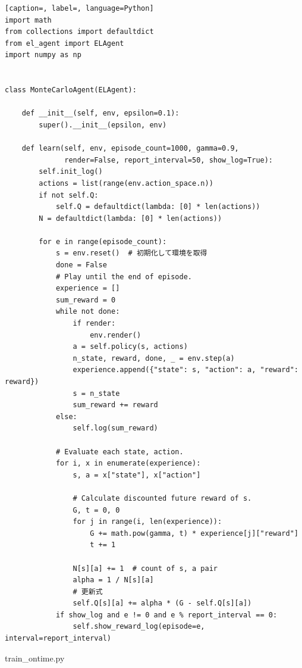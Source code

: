 \documentclass[a4paper,12pt]{jsreport}
\theoremstyle{definition}
\begin{document}
\begin{lstlisting}[caption=, label=, language=Python]
import math
from collections import defaultdict
from el_agent import ELAgent
import numpy as np


class MonteCarloAgent(ELAgent):

    def __init__(self, env, epsilon=0.1):
        super().__init__(epsilon, env)

    def learn(self, env, episode_count=1000, gamma=0.9,
              render=False, report_interval=50, show_log=True):
        self.init_log()
        actions = list(range(env.action_space.n))
        if not self.Q:
            self.Q = defaultdict(lambda: [0] * len(actions))
        N = defaultdict(lambda: [0] * len(actions))

        for e in range(episode_count):
            s = env.reset()  # 初期化して環境を取得
            done = False
            # Play until the end of episode.
            experience = []
            sum_reward = 0
            while not done:
                if render:
                    env.render()
                a = self.policy(s, actions)
                n_state, reward, done, _ = env.step(a)
                experience.append({"state": s, "action": a, "reward": reward})
                s = n_state
                sum_reward += reward
            else:
                self.log(sum_reward)

            # Evaluate each state, action.
            for i, x in enumerate(experience):
                s, a = x["state"], x["action"]

                # Calculate discounted future reward of s.
                G, t = 0, 0
                for j in range(i, len(experience)):
                    G += math.pow(gamma, t) * experience[j]["reward"]
                    t += 1

                N[s][a] += 1  # count of s, a pair
                alpha = 1 / N[s][a]
                # 更新式
                self.Q[s][a] += alpha * (G - self.Q[s][a])
            if show_log and e != 0 and e % report_interval == 0:
                self.show_reward_log(episode=e, interval=report_interval)

\end{lstlisting}
train\_ontime.py
\end{document}
